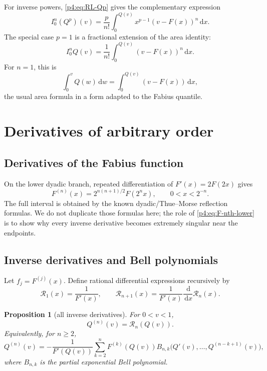 \documentclass[11pt,oneside]{article}
\newtheorem{proposition}[theorem]{Proposition}
\theoremstyle{definition}
\theoremstyle{remark}
\newcommand{\F}{F}
\newcommand{\Q}{Q}
\newcommand{\dd}{\,\mathrm d}
\newcommand{\1}{\mathbf 1}
\begin{document}
For inverse powers, \cref{p4:eq:RL-Qp} gives the complementary expression
\begin{equation}\label{p4:eq:nth-Q-primitive}
 I_0^n(\Q^p)(v)
 =\frac{p}{n!}\int_0^{\Q(v)}x^{p-1}(v-\F(x))^n\dd x.
\end{equation}
The special case \(p=1\) is a fractional extension of the area identity:
\begin{equation}\label{p4:eq:nth-Q-area}
 I_0^n\Q(v)=\frac1{n!}\int_0^{\Q(v)}(v-\F(x))^n\dd x.
\end{equation}
For \(n=1\), this is
\begin{equation}\label{p4:eq:classic-inverse-area}
 \int_0^v\Q(w)\dd w=\int_0^{\Q(v)}(v-\F(x))\dd x,
\end{equation}
the usual area formula in a form adapted to the Fabius quantile.

\section{Derivatives of arbitrary order}

\subsection{Derivatives of the Fabius function}

On the lower dyadic branch, repeated differentiation of
\(\F'(x)=2\F(2x)\) gives
\begin{equation}\label{p4:eq:F-nth-lower}
 \F^{(n)}(x)=2^{n(n+1)/2}\F(2^nx),
 \qquad 0<x<2^{-n}.
\end{equation}
The full interval is obtained by the known dyadic/Thue--Morse reflection formulas.
We do not duplicate those formulas here; the role of \cref{p4:eq:F-nth-lower} is to show
why every inverse derivative becomes extremely singular near the endpoints.

\subsection{Inverse derivatives and Bell polynomials}

Let \(f_j=\F^{(j)}(x)\).  Define rational differential expressions recursively by
\begin{equation}\label{p4:eq:Rinverse-rec}
 \mathcal R_1(x)=\frac1{\F'(x)},
 \qquad
 \mathcal R_{n+1}(x)=\frac1{\F'(x)}\frac{\dd}{\dd x}\mathcal R_n(x).
\end{equation}

\begin{proposition}[all inverse derivatives]\label{p4:prop:inverse-derivatives}
For \(0<v<1\),
\begin{equation}\label{p4:eq:Q-nth-operator}
 \Q^{(n)}(v)=\mathcal R_n(\Q(v)).
\end{equation}
Equivalently, for \(n\ge2\),
\begin{equation}\label{p4:eq:Q-Bell-rec}
 \Q^{(n)}(v)
 =-\frac1{\F'(\Q(v))}
 \sum_{k=2}^n\F^{(k)}(\Q(v))
 B_{n,k}\bigl(\Q'(v),\ldots,\Q^{(n-k+1)}(v)\bigr),
\end{equation}
where \(B_{n,k}\) is the partial exponential Bell polynomial.
\end{proposition}
\end{document}
